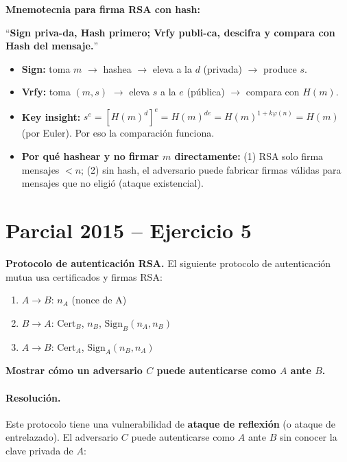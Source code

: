 \documentclass[11pt,a4paper]{article}
\begin{document}
\begin{tipsbox}
\textbf{Mnemotecnia para firma RSA con hash:}

\medskip
``\textbf{Sign priva-da, Hash primero; Vrfy publi-ca, descifra y compara con Hash del mensaje.}''

\medskip
\begin{itemize}
  \item \textbf{Sign:} toma $m$ $\to$ hashea $\to$ eleva a la $d$ (privada) $\to$ produce $s$.
  \item \textbf{Vrfy:} toma $(m, s)$ $\to$ eleva $s$ a la $e$ (pública) $\to$ compara con $H(m)$.
  \item \textbf{Key insight:} $s^e = [H(m)^d]^e = H(m)^{de} = H(m)^{1+k\varphi(n)} = H(m)$ (por Euler). Por eso la comparación funciona.
  \item \textbf{Por qué hashear y no firmar $m$ directamente:} (1) RSA solo firma mensajes $< n$; (2) sin hash, el adversario puede fabricar firmas válidas para mensajes que no eligió (ataque existencial).
\end{itemize}
\end{tipsbox}

\section{Parcial 2015 -- Ejercicio 5}
\label{sec:rsa2015c}

\begin{consignabox}
\textbf{Protocolo de autenticación RSA.} El siguiente protocolo de autenticación mutua usa certificados y firmas RSA:
\begin{enumerate}
  \item $A \to B$: $n_A$ (nonce de A)
  \item $B \to A$: $\text{Cert}_B$, $n_B$, $\text{Sign}_B(n_A, n_B)$
  \item $A \to B$: $\text{Cert}_A$, $\text{Sign}_A(n_B, n_A)$
\end{enumerate}
\textbf{Mostrar cómo un adversario $C$ puede autenticarse como $A$ ante $B$.}
\end{consignabox}

\paragraph{Resolución.}

Este protocolo tiene una vulnerabilidad de \textbf{ataque de reflexión} (o ataque de entrelazado). El adversario $C$ puede autenticarse como $A$ ante $B$ sin conocer la clave privada de $A$:
\end{document}
